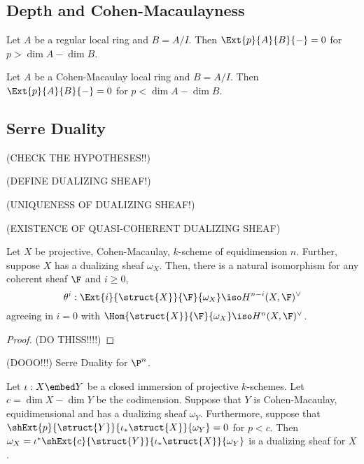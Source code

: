 \documentclass[12pt]{article}
\begin{document}
\subsection{Depth and Cohen-Macaulayness}

\begin{prop}
Let $A$ be a regular local ring and $B = A / I$. Then $\Ext{p}{A}{B}{-} = 0$ for $p > \dim{A} - \dim{B}$. 
\end{prop}

\begin{prop}
Let $A$ be a Cohen-Macaulay local ring and $B = A/I$. Then $\Ext{p}{A}{B}{-} = 0$ for $p < \dim{A} - \dim{B}$. 
\end{prop}

\subsection{Serre Duality}

(CHECK THE HYPOTHESES!!)

(DEFINE DUALIZING SHEAF!)

(UNIQUENESS OF DUALIZING SHEAF!)

(EXISTENCE OF QUASI-COHERENT DUALIZING SHEAF)

\begin{theorem}
Let $X$ be projective, Cohen-Macaulay, $k$-scheme of equidimension $n$. Further, suppose $X$ has a dualizing sheaf $\omega_X$. Then, there is a natural isomorphism for any coherent sheaf $\F$ and $i \ge 0$,
\[ \theta^i : \Ext{i}{\struct{X}}{\F}{\omega_X} \iso H^{n-i}(X, \F)^\vee \] 
agreeing in $i = 0$ with $\Hom{\struct{X}}{\F}{\omega_X} \iso H^n(X, \F)^\vee$.
\end{theorem}

\begin{proof}
(DO THISS!!!!)
\end{proof}

\begin{theorem}
(DOOO!!!) Serre Duality for $\P^n$. 
\end{theorem}


\begin{prop}
Let $\iota : X \embed Y$ be a closed immersion of projective $k$-schemes. Let $c = \dim{X} - \dim{Y}$ be the codimension. Suppose that $Y$ is Cohen-Macaulay, equidimensional and has a dualizing sheaf $\omega_Y$. Furthermore, suppose that $\shExt{p}{\struct{Y}}{\iota_* \struct{X}}{\omega_Y} = 0$ for $p < c$. Then $\omega_X = \iota^* \shExt{c}{\struct{Y}}{\iota_* \struct{X}}{\omega_Y}$ is a dualizing sheaf for $X$. 
\end{prop}
\end{document}
